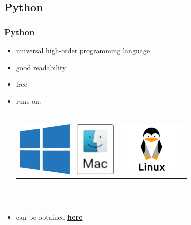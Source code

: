 \documentclass[12pt,a4paper]{beamer}
\begin{document}
\subsection{Python}
\begin{frame}
    \frametitle{Python}
    \begin{itemize}
        \item universal high-order programming language
        \item good readability
        \item free
        \item runs on: \\
        \quad \\
        \begin{center}
            \begin{tabular}{ccc}
                \includegraphics{../pictures/windows_logo.png} \hspace{1cm} &
                \includegraphics{../pictures/macos_logo.png} \hspace{1cm} &
                \includegraphics{../pictures/linux_logo.png}
            \end{tabular}
        \end{center}\\
        \quad \\
        \item can be obtained \href{https://www.python.org/}{\textbf{here}}
    \end{itemize}
\end{frame}
\end{document}
